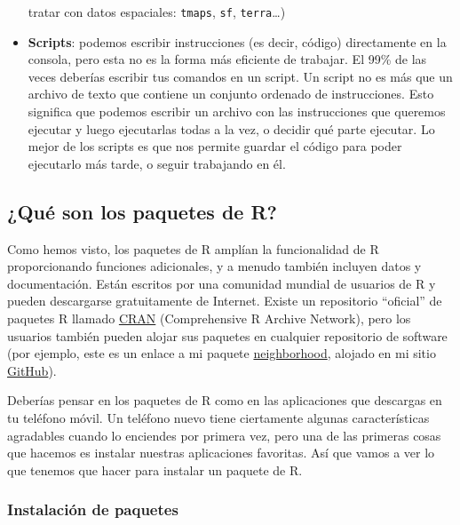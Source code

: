 \documentclass[
  letterpaper,
  DIV=11,
  numbers=noendperiod]{scrreprt}
\begin{document}
\begin{itemize}
  tratar con datos espaciales: \texttt{tmaps}, \texttt{sf},
  \texttt{terra}\ldots)
\item
  \textbf{Scripts}: podemos escribir instrucciones (es decir, código)
  directamente en la consola, pero esta no es la forma más eficiente de
  trabajar. El 99\% de las veces deberías escribir tus comandos en un
  script. Un script no es más que un archivo de texto que contiene un
  conjunto ordenado de instrucciones. Esto significa que podemos
  escribir un archivo con las instrucciones que queremos ejecutar y
  luego ejecutarlas todas a la vez, o decidir qué parte ejecutar. Lo
  mejor de los scripts es que nos permite guardar el código para poder
  ejecutarlo más tarde, o seguir trabajando en él.
\end{itemize}

\hypertarget{quuxe9-son-los-paquetes-de-r}{%
\subsection{¿Qué son los paquetes de
R?}\label{quuxe9-son-los-paquetes-de-r}}

Como hemos visto, los paquetes de R amplían la funcionalidad de R
proporcionando funciones adicionales, y a menudo también incluyen datos
y documentación. Están escritos por una comunidad mundial de usuarios de
R y pueden descargarse gratuitamente de Internet. Existe un repositorio
``oficial'' de paquetes R llamado
\href{https://cran.r-project.org/web/packages/index.html}{CRAN}
(Comprehensive R Archive Network), pero los usuarios también pueden
alojar sus paquetes en cualquier repositorio de software (por ejemplo,
este es un enlace a mi paquete
\href{https://github.com/ameztegui/neighborhood}{neighborhood}, alojado
en mi sitio \href{https://github.com/ameztegui}{GitHub}).

Deberías pensar en los paquetes de R como en las aplicaciones que
descargas en tu teléfono móvil. Un teléfono nuevo tiene ciertamente
algunas características agradables cuando lo enciendes por primera vez,
pero una de las primeras cosas que hacemos es instalar nuestras
aplicaciones favoritas. Así que vamos a ver lo que tenemos que hacer
para instalar un paquete de R.

\hypertarget{instalaciuxf3n-de-paquetes}{%
\subsubsection{Instalación de
paquetes}\label{instalaciuxf3n-de-paquetes}}
\end{document}
